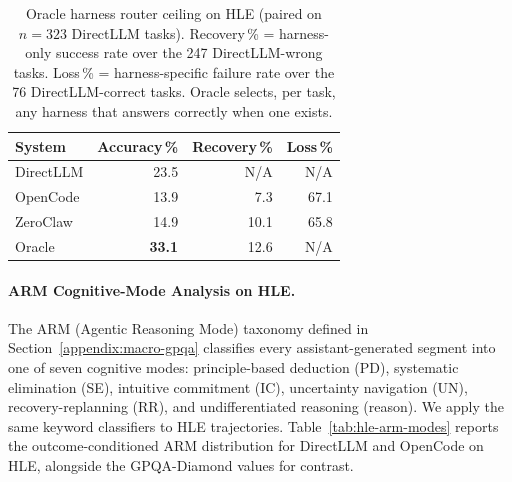 \begin{table}[t]
\centering
\small
\caption{%
  Oracle harness router ceiling on HLE (paired on $n=323$ DirectLLM tasks).
  Recovery\,\% = harness-only success rate over the 247 DirectLLM-wrong tasks.
  Loss\,\% = harness-specific failure rate over the 76 DirectLLM-correct tasks.
  Oracle selects, per task, any harness that answers correctly when one exists.
}
\label{tab:hle-oracle}
\setlength{\tabcolsep}{4pt}
\begin{tabular}{lrrr}
\toprule
System & Accuracy\,\% & Recovery\,\% & Loss\,\% \\
\midrule
DirectLLM & 23.5 & N/A  & N/A \\
OpenCode  & 13.9 &  7.3 & 67.1 \\
ZeroClaw  & 14.9 & 10.1 & 65.8 \\
\midrule
Oracle    & \textbf{33.1} & 12.6 & N/A \\
\bottomrule
\end{tabular}
\end{table}


\paragraph{ARM Cognitive-Mode Analysis on HLE.}

The ARM (Agentic Reasoning Mode) taxonomy defined in
Section~\ref{appendix:macro-gpqa} classifies every assistant-generated segment
into one of seven cognitive modes: principle-based deduction (PD), systematic
elimination (SE), intuitive commitment (IC), uncertainty navigation (UN),
recovery-replanning (RR), and undifferentiated reasoning (reason).
We apply the same keyword classifiers to HLE trajectories.
Table~\ref{tab:hle-arm-modes} reports the outcome-conditioned ARM distribution
for DirectLLM and OpenCode on HLE, alongside the GPQA-Diamond values for
contrast.

